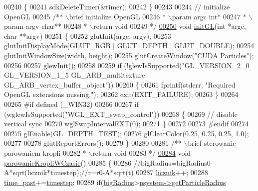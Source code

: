 \begin{DoxyCode}
{00240 \{
00241     sdkDeleteTimer(&timer);
00242 \}
00243 
00244 \textcolor{comment}{// initialize OpenGL}
00245 \textcolor{comment}{/** \(\backslash\)brief initialize OpenGL}
00246 \textcolor{comment}{ * \(\backslash\)param argc int*}
00247 \textcolor{comment}{ * \(\backslash\)param argv char**}
00248 \textcolor{comment}{ * \(\backslash\)return void}
00249 \textcolor{comment}{ */}
\hypertarget{particles_8cpp_source_l00250}{}\hyperlink{particles_8cpp_a0365f63f071ee9e32dddb2ff65c7628d}{00250} \textcolor{keywordtype}{void} \hyperlink{particles_8cpp_a0365f63f071ee9e32dddb2ff65c7628d}{initGL}(\textcolor{keywordtype}{int} *argc, \textcolor{keywordtype}{char} **argv)
00251 \{
00252     glutInit(argc, argv);
00253     glutInitDisplayMode(GLUT\_RGB | GLUT\_DEPTH | GLUT\_DOUBLE);
00254     glutInitWindowSize(width, height);
00255     glutCreateWindow(\textcolor{stringliteral}{"CUDA Particles"});
00256 
00257     glewInit();
00258 
00259     \textcolor{keywordflow}{if} (!glewIsSupported(\textcolor{stringliteral}{"GL\_VERSION\_2\_0 GL\_VERSION\_1\_5 GL\_ARB\_multitexture
       GL\_ARB\_vertex\_buffer\_object"}))
00260     \{
00261         fprintf(stderr, \textcolor{stringliteral}{"Required OpenGL extensions missing."});
00262         exit(EXIT\_FAILURE);
00263     \}
00264 
00265 #\textcolor{keywordflow}{if} defined (\_WIN32)
00266 
00267     \textcolor{keywordflow}{if} (wglewIsSupported(\textcolor{stringliteral}{"WGL\_EXT\_swap\_control"}))
00268     \{
00269         \textcolor{comment}{// disable vertical sync}
00270         wglSwapIntervalEXT(0);
00271     \}
00272 
00273 #endif
00274 
00275     glEnable(GL\_DEPTH\_TEST);
00276     glClearColor(0.25, 0.25, 0.25, 1.0);
00277 
00278     glutReportErrors();
00279 \}
00280 
00281 \textcolor{comment}{/** \(\backslash\)brief sterowanie parowaniem kropli}
00282 \textcolor{comment}{ * \(\backslash\)return void}
00283 \textcolor{comment}{ */}
\hypertarget{particles_8cpp_source_l00284}{}\hyperlink{particles_8cpp_ad38a0dbec46194a94a86cfa6416ce48f}{00284} \textcolor{keywordtype}{void} \hyperlink{particles_8cpp_ad38a0dbec46194a94a86cfa6416ce48f}{parowanieKropliWCzasie}()
00285 \{
00286         \textcolor{comment}{//bigRadius=bigRadius0-A*sqrt(licznik*timestep);//r=r0-A*sqrt(t)}
00287         \hyperlink{particles_8cpp_aa9253cb34e1b40809228671a8921144d}{licznik}++;
00288         \hyperlink{particles_8cpp_ad6a23ec608122a4f7c824f903730f206}{time\_past}+=\hyperlink{particles_8cpp_a30721fccdcf1a48ddb65267d3a5a9d29}{timestep};
00289         \textcolor{keywordflow}{if}(\hyperlink{particles_8cpp_ae17f6f64c66e0edf9e6dd3b69013134b}{bigRadius}>\hyperlink{particles_8cpp_a6fa81770b30ecffc7110864e64fe4fc5}{psystem}\hyperlink{class_particle_system_abdb59a91d8483017ad71455bb2958993}{->}\hyperlink{class_particle_system_abdb59a91d8483017ad71455bb2958993}{getParticleRadius}
}
\end{DoxyCode}
